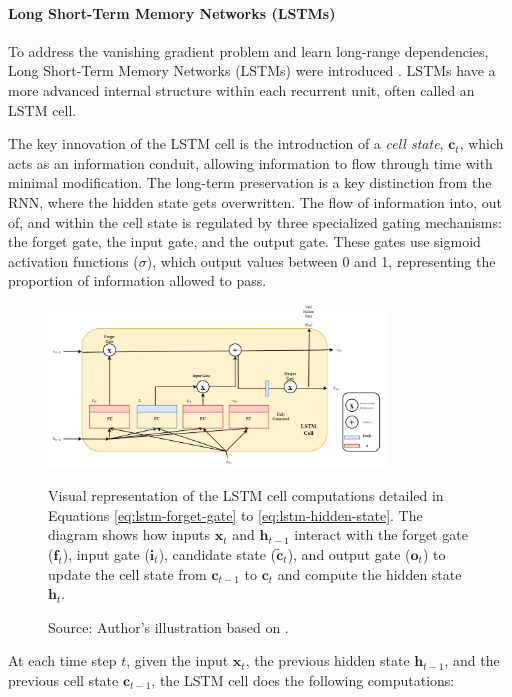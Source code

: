 \paragraph{\textbf{Long Short-Term Memory Networks (LSTMs)}}
\label{sec:lstm}

To address the vanishing gradient problem and learn long-range dependencies, Long Short-Term Memory Networks (LSTMs) were introduced \autocite{hochreiter1997long}. LSTMs have a more advanced internal structure within each recurrent unit, often called an LSTM cell.

The key innovation of the LSTM cell is the introduction of a \textit{cell state}, \( \bm{c}_t \), which acts as an information conduit, allowing information to flow through time with minimal modification. The long-term preservation is a key distinction from the RNN, where the hidden state gets overwritten. The flow of information into, out of, and within the cell state is regulated by three specialized gating mechanisms: the forget gate, the input gate, and the output gate. These gates use sigmoid activation functions (\(\sigma\)), which output values between 0 and 1, representing the proportion of information allowed to pass.

\begin{figure}[htbp]
  \centering
  \includegraphics[width=0.8\textwidth]{figures/lstmcell.png}
  \caption[LSTM Cell]{Visual representation of the LSTM cell computations detailed in Equations \ref{eq:lstm-forget-gate} to \ref{eq:lstm-hidden-state}. The diagram shows how inputs $\bm{x}_t$ and $\bm{h}_{t-1}$ interact with the forget gate ($\bm{f}_t$), input gate ($\bm{i}_t$), candidate state ($\bm{\tilde{c}}_t$), and output gate ($\bm{o}_t$) to update the cell state from $\bm{c}_{t-1}$ to $\bm{c}_t$ and compute the hidden state $\bm{h}_t$.}
  \caption*{Source: Author's illustration based on \autocite{geron2022hands}.}
  \label{fig:lstm_cell}
\end{figure}
At each time step \( t \), given the input \( \bm{x}_t \), the previous hidden state \( \bm{h}_{t-1} \), and the previous cell state \( \bm{c}_{t-1} \), the LSTM cell does the following computations:

